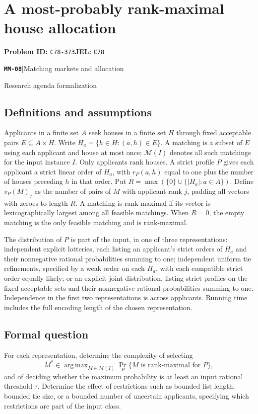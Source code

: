 \documentclass[11pt,a4paper]{article}
\DeclareMathOperator*{\argmax}{arg\,max}
\newcommand{\entrymeta}[3]{{\sffamily\small\color{muted}\textbf{\texttt{#1}}\quad|\quad #2\par #3\par}}
\begin{document}
\section*{A most-probably rank-maximal house allocation}
\textbf{Problem ID:} \texttt{C78-373}\quad \textbf{JEL:} \texttt{C78}\par
\label{problem:OP-0549}
\label{beyond:MM-08}
\entrymeta{MM-08}{Matching markets and allocation}{Research agenda formalization}
\subsection*{Definitions and assumptions}
Applicants in a finite set $A$ seek houses in a finite set $H$ through fixed acceptable pairs $E\subseteq A\times H$. Write $H_a=\{h\in H:(a,h)\in E\}$. A matching is a subset of $E$ using each applicant and house at most once; $\mathcal M(I)$ denotes all such matchings for the input instance $I$. Only applicants rank houses. A strict profile $P$ gives each applicant a strict linear order of $H_a$, with $r_P(a,h)$ equal to one plus the number of houses preceding $h$ in that order. Put $R=\max(\{0\}\cup\{|H_a|:a\in A\})$. Define $v_P(M)_j$ as the number of pairs of $M$ with applicant rank $j$, padding all vectors with zeroes to length $R$. A matching is rank-maximal if its vector is lexicographically largest among all feasible matchings. When $R=0$, the empty matching is the only feasible matching and is rank-maximal.

The distribution of $P$ is part of the input, in one of three representations: independent explicit lotteries, each listing an applicant's strict orders of $H_a$ and their nonnegative rational probabilities summing to one; independent uniform tie refinements, specified by a weak order on each $H_a$, with each compatible strict order equally likely; or an explicit joint distribution, listing strict profiles on the fixed acceptable sets and their nonnegative rational probabilities summing to one. Independence in the first two representations is across applicants. Running time includes the full encoding length of the chosen representation.
\subsection*{Formal question}
For each representation, determine the complexity of selecting
\[
 M^*\in\argmax_{M\in\mathcal M(I)}
 \Pr_P\{M\text{ is rank-maximal for }P\},
\]
and of deciding whether the maximum probability is at least an input rational threshold $\tau$. Determine the effect of restrictions such as bounded list length, bounded tie size, or a bounded number of uncertain applicants, specifying which restrictions are part of the input class.
\end{document}

